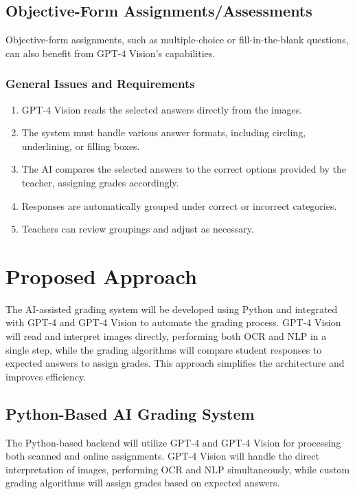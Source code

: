 \documentclass[ms,twoside,print]{nuthesis}
\begin{document}
\subsection{Objective-Form Assignments/Assessments}

Objective-form assignments, such as multiple-choice or fill-in-the-blank questions, can also benefit from GPT-4 Vision's capabilities.

\subsubsection{General Issues and Requirements}

\begin{enumerate}
    \item GPT-4 Vision reads the selected answers directly from the images.
    \item The system must handle various answer formats, including circling, underlining, or filling boxes.
    \item The AI compares the selected answers to the correct options provided by the teacher, assigning grades accordingly.
    \item Responses are automatically grouped under correct or incorrect categories.
    \item Teachers can review groupings and adjust as necessary.
\end{enumerate}

\section{Proposed Approach}

The AI-assisted grading system will be developed using Python and integrated with GPT-4 and GPT-4 Vision to automate the grading process. GPT-4 Vision will read and interpret images directly, performing both OCR and NLP in a single step, while the grading algorithms will compare student responses to expected answers to assign grades. This approach simplifies the architecture and improves efficiency.

\subsection{Python-Based AI Grading System}

The Python-based backend will utilize GPT-4 and GPT-4 Vision for processing both scanned and online assignments. GPT-4 Vision will handle the direct interpretation of images, performing OCR and NLP simultaneously, while custom grading algorithms will assign grades based on expected answers.
\end{document}

